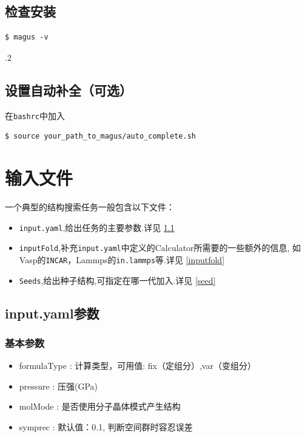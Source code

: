 \documentclass[12pt]{article}
\newcommand{\file}[1]{\texttt{#1}}
\begin{document}
\subsection{检查安装}
\begin{tcolorbox}
    \begin{verbatim}
$ magus -v
    \end{verbatim}
.2
\end{tcolorbox}

\subsection{设置自动补全（可选）}
在\file{bashrc}中加入
\begin{tcolorbox}
    \begin{verbatim}
$ source your_path_to_magus/auto_complete.sh
    \end{verbatim}
\end{tcolorbox}
\newpage
\section{输入文件}
一个典型的结构搜索任务一般包含以下文件：
\begin{itemize}
    \item \file{input.yaml},给出任务的主要参数.详见 \ref{inputpara}
    \item \file{inputFold},补充\file{input.yaml}中定义的Calculator所需要的一些额外的信息,
    如Vasp的\file{INCAR}，Lammps的\file{in.lammps}等.详见 \ref{inputfold}
    \item \file{Seeds},给出种子结构,可指定在哪一代加入.详见 \ref{seed}
\end{itemize}
\subsection{input.yaml参数} \label{inputpara}

\subsubsection{基本参数}
\begin{itemize}
    \item formulaType       : 计算类型，可用值:  fix（定组分）,var（变组分）
    \item pressure          : 压强(GPa)
    \item molMode           : 是否使用分子晶体模式产生结构
    \item symprec           : 默认值：0.1, 判断空间群时容忍误差
\end{itemize}
\end{document}
